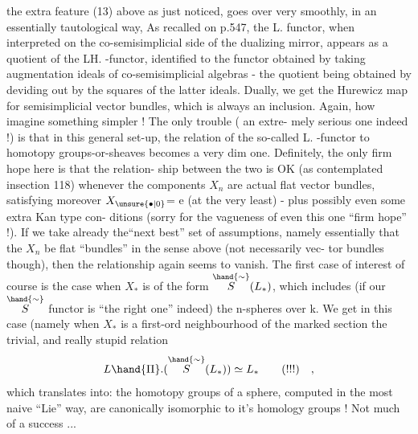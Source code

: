 
the extra feature (13) above as just noticed,\hand{)} goes over very smoothly,
in an essentially tautological way, As recalled on p.547, the L\hand{$\Pi$}.
functor, when interpreted on the co-semisimplicial side
of the dualizing mirror, appears as a quotient of the LH\hand{$\sim$}. -functor,
identified to the functor obtained by taking augmentation ideals of
co-semisimplicial algebras - the quotient being obtained by deviding
out by the squares of the latter ideals. Dually, we get the Hurewicz
map for semisimplicial vector bundles, which is always an inclusion.
Again, how imagine something simpler ! The only trouble ( an extre-%
mely serious one indeed !) is that in this general set-up, the relation
of the so-called L\hand{$\Pi$}. -functor to homotopy groups-or-sheaves becomes a
very dim one. Definitely, the only firm hope here is that the relation-%
ship between the two is OK (as contemplated in\hand{|}section 118) whenever
the components $X_{n}$ are actual flat vector bundles, satisfying moreover
$X_{\unsure{\bullet|0}}$= e (at the very least) - plus possibly even some extra Kan type con-%
ditions (sorry for the vagueness of even this one ``firm hope'' !). If
we take already the``next best'' set of assumptions, namely essentially
that the $X_{n}$ be flat ``bundles'' in the sense above (not necessarily vec-%
tor bundles though), then the  relationship again seems to vanish. The
first case of interest of course is the case when $X_{*}$ is of the form
$\overset{\hand{\sim}}{S}(L_{*})$, which includes (if our $\overset{\hand{\sim}}{S}$ functor is ``the right one'' indeed) the
n-spheres over k. We get in this case (namely when $X_{*}$ is a first-ord
neighbourhood of the marked section\over{,}{)} the trivial, and really stupid
relation
\[ L\hand{\Pi}.(\overset{\hand{\sim}}{S}(L_{*}))\simeq L_{*} \qquad (!!!) \quad , \]
\margin{[}which translates into: the homotopy groups of a sphere, computed in
the most naive ``Lie'' way, are canonically isomorphic to it's homology
groups ! Not much of a success ...

